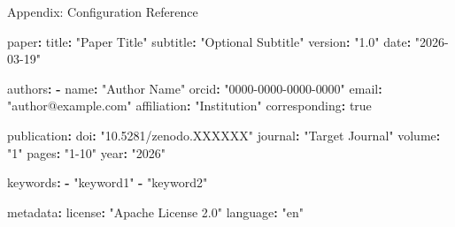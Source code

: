 \documentclass[
  ignorenonframetext,
]{beamer}
\author{\texorpdfstring{}{}}
\date{}
\newenvironment{Shaded}{}{}
\newcommand{\AttributeTok}[1]{\textcolor[rgb]{0.49,0.56,0.16}{#1}}
\newcommand{\CharTok}[1]{\textcolor[rgb]{0.25,0.44,0.63}{#1}}
\newcommand{\FunctionTok}[1]{\textcolor[rgb]{0.02,0.16,0.49}{#1}}
\newcommand{\KeywordTok}[1]{\textcolor[rgb]{0.00,0.44,0.13}{\textbf{#1}}}
\newcommand{\StringTok}[1]{\textcolor[rgb]{0.25,0.44,0.63}{#1}}
\begin{document}
\begin{frame}
\newpage
\end{frame}

\begin{frame}[fragile]{Appendix: Configuration Reference}
\protect{}\label{appendix-config}
\begin{table}[h]
\caption{Configuration schema for \texttt{config.yaml}, showing all supported fields and their structure.}
\label{tab:config-reference}
\end{table}

\begin{Shaded}
\begin{Highlighting}[]
\FunctionTok{paper}\KeywordTok{:}
\AttributeTok{  }\FunctionTok{title}\KeywordTok{:}\AttributeTok{ }\StringTok{"Paper Title"}
\AttributeTok{  }\FunctionTok{subtitle}\KeywordTok{:}\AttributeTok{ }\StringTok{"Optional Subtitle"}
\AttributeTok{  }\FunctionTok{version}\KeywordTok{:}\AttributeTok{ }\StringTok{"1.0"}
\AttributeTok{  }\FunctionTok{date}\KeywordTok{:}\AttributeTok{ }\StringTok{"2026{-}03{-}19"}

\FunctionTok{authors}\KeywordTok{:}
\AttributeTok{  }\KeywordTok{{-}}\AttributeTok{ }\FunctionTok{name}\KeywordTok{:}\AttributeTok{ }\StringTok{"Author Name"}
\AttributeTok{    }\FunctionTok{orcid}\KeywordTok{:}\AttributeTok{ }\StringTok{"0000{-}0000{-}0000{-}0000"}
\AttributeTok{    }\FunctionTok{email}\KeywordTok{:}\AttributeTok{ }\StringTok{"author@example.com"}
\AttributeTok{    }\FunctionTok{affiliation}\KeywordTok{:}\AttributeTok{ }\StringTok{"Institution"}
\AttributeTok{    }\FunctionTok{corresponding}\KeywordTok{:}\AttributeTok{ }\CharTok{true}

\FunctionTok{publication}\KeywordTok{:}
\AttributeTok{  }\FunctionTok{doi}\KeywordTok{:}\AttributeTok{ }\StringTok{"10.5281/zenodo.XXXXXX"}
\AttributeTok{  }\FunctionTok{journal}\KeywordTok{:}\AttributeTok{ }\StringTok{"Target Journal"}
\AttributeTok{  }\FunctionTok{volume}\KeywordTok{:}\AttributeTok{ }\StringTok{"1"}
\AttributeTok{  }\FunctionTok{pages}\KeywordTok{:}\AttributeTok{ }\StringTok{"1{-}10"}
\AttributeTok{  }\FunctionTok{year}\KeywordTok{:}\AttributeTok{ }\StringTok{"2026"}

\FunctionTok{keywords}\KeywordTok{:}
\AttributeTok{  }\KeywordTok{{-}}\AttributeTok{ }\StringTok{"keyword1"}
\AttributeTok{  }\KeywordTok{{-}}\AttributeTok{ }\StringTok{"keyword2"}

\FunctionTok{metadata}\KeywordTok{:}
\AttributeTok{  }\FunctionTok{license}\KeywordTok{:}\AttributeTok{ }\StringTok{"Apache License 2.0"}
\AttributeTok{  }\FunctionTok{language}\KeywordTok{:}\AttributeTok{ }\StringTok{"en"}


\end{Highlighting}
\end{Shaded}
\end{frame}
\end{document}
